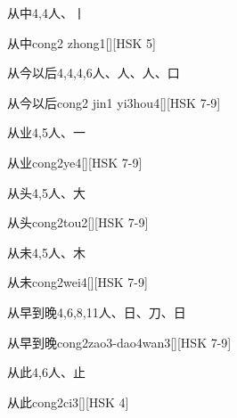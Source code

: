 \begin{Entry}{从中}{4,4}{⼈、⼁}
  \begin{Phonetics}{从中}{cong2 zhong1}[][HSK 5]
  \end{Phonetics}
\end{Entry}

\begin{Entry}{从今以后}{4,4,4,6}{⼈、⼈、⼈、⼝}
  \begin{Phonetics}{从今以后}{cong2 jin1 yi3hou4}[][HSK 7-9]
  \end{Phonetics}
\end{Entry}

\begin{Entry}{从业}{4,5}{⼈、⼀}
  \begin{Phonetics}{从业}{cong2ye4}[][HSK 7-9]
  \end{Phonetics}
\end{Entry}

\begin{Entry}{从头}{4,5}{⼈、⼤}
  \begin{Phonetics}{从头}{cong2tou2}[][HSK 7-9]
  \end{Phonetics}
\end{Entry}

\begin{Entry}{从未}{4,5}{⼈、⽊}
  \begin{Phonetics}{从未}{cong2wei4}[][HSK 7-9]
  \end{Phonetics}
\end{Entry}

\begin{Entry}{从早到晚}{4,6,8,11}{⼈、⽇、⼑、⽇}
  \begin{Phonetics}{从早到晚}{cong2zao3-dao4wan3}[][HSK 7-9]
  \end{Phonetics}
\end{Entry}

\begin{Entry}{从此}{4,6}{⼈、⽌}
  \begin{Phonetics}{从此}{cong2ci3}[][HSK 4]
  \end{Phonetics}
\end{Entry}

